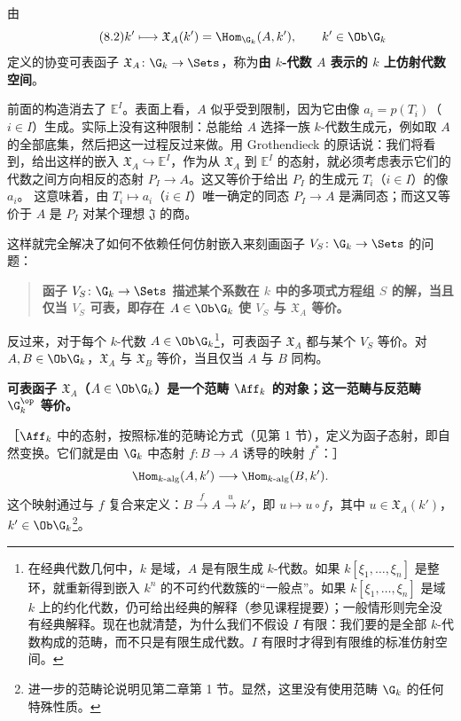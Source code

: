 由
\begin{equation}\tag{8.2}k'\longmapsto\mathfrak X_A(k')=\Hom_{\G_k}(A,k'),\qquad k'\in\Ob\G_k
\end{equation}
定义的协变可表函子 $\mathfrak X_A\colon\G_k\to\Sets$，称为\textbf{由 $k$-代数 $A$ 表示的 $k$ 上仿射代数空间}。

前面的构造消去了 $\mathbb E^I$。表面上看，$A$ 似乎受到限制，因为它由像 $a_i=p(T_i)$（$i\in I$）生成。实际上没有这种限制：总能给 $A$ 选择一族 $k$-代数生成元，例如取 $A$ 的全部底集，然后把这一过程反过来做。用 Grothendieck 的原话说：我们将看到，给出这样的嵌入 $\mathfrak X_A\hookrightarrow\mathbb E^I$，作为从 $\mathfrak X_A$ 到 $\mathbb E^I$ 的态射，就必须考虑表示它们的代数之间方向相反的态射 $P_I\to A$。这又等价于给出 $P_I$ 的生成元 $T_i$（$i\in I$）的像 $a_i$。
这意味着，由 $T_i\mapsto a_i$（$i\in I$）唯一确定的同态 $P_I\to A$ 是满同态；而这又等价于 $A$ 是 $P_I$ 对某个理想 $\mathfrak J$ 的商。

这样就完全解决了如何不依赖任何仿射嵌入来刻画函子 $V_S\colon\G_k\to\Sets$ 的问题：

\begin{quote}\bfseries 函子 $V_S\colon\G_k\to\Sets$ 描述某个系数在 $k$ 中的多项式方程组 $S$ 的解，当且仅当 $V_S$ 可表，即存在 $A\in\Ob\G_k$ 使 $V_S$ 与 $\mathfrak X_A$ 等价。\end{quote}
反过来，对于每个 $k$-代数 $A\in\Ob\G_k$\footnote{在经典代数几何中，$k$ 是域，$A$ 是有限生成 $k$-代数。如果 $k[\xi_1,\ldots,\xi_n]$ 是整环，就重新得到嵌入 $k^n$ 的不可约代数簇的“一般点”。如果 $k[\xi_1,\ldots,\xi_n]$ 是域 $k$ 上的约化代数，仍可给出经典的解释（参见课程提要）；一般情形则完全没有经典解释。现在也就清楚，为什么我们不假设 $I$ 有限：我们要的是全部 $k$-代数构成的范畴，而不只是有限生成代数。$I$ 有限时才得到有限维的标准仿射空间。}，可表函子 $\mathfrak X_A$ 都与某个 $V_S$ 等价。对 $A,B\in\Ob\G_k$，$\mathfrak X_A$ 与 $\mathfrak X_B$ 等价，当且仅当 $A$ 与 $B$ 同构。

\textbf{可表函子 $\mathfrak X_A$（$A\in\Ob\G_k$）是一个范畴 $\Aff_k$ 的对象；这一范畴与反范畴 $\G_k^{\op}$ 等价。}

［$\Aff_k$ 中的态射，按照标准的范畴论方式（见第 1 节），定义为函子态射，即自然变换。它们就是由 $\G_k$ 中态射 $f\colon B\to A$ 诱导的映射 $f^*$：］
\[
\Hom_{k\text{-alg}}(A,k')\longrightarrow\Hom_{k\text{-alg}}(B,k').
\]
这个映射通过与 $f$ 复合来定义：$B\xrightarrow{f}A\xrightarrow{u}k'$，即 $u\mapsto u\circ f$，其中 $u\in\mathfrak X_A(k')$，$k'\in\Ob\G_k$\footnote{进一步的范畴论说明见第二章第 1 节。显然，这里没有使用范畴 $\G_k$ 的任何特殊性质。}。

